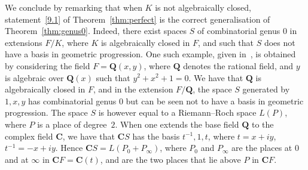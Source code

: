 \documentclass[10pt]{amsart}
\newcommand{\C}{\mathbf C}
\theoremstyle{definition}
\theoremstyle{remark}
\newcommand*\Q{{\mathbf Q}}
\renewcommand*\C{{\mathbf C}}
\begin{document}
We conclude by remarking that when $K$ is not algebraically closed, statement~\eqref{9.1} of Theorem~\ref{thm:perfect} is the correct generalisation of Theorem~\ref{thm:genus0}. Indeed, there exist spaces $S$ of combinatorial genus $0$ in extensions $F/K$, where $K$ is algebraically closed in $F$, and such that $S$ does not have a basis in geometric progression. One such example, given in~\cite{bszVosper}, is obtained by considering the field $F=\Q(x,y)$, where $\Q$ denotes the rational field, and $y$ is algebraic over $\Q(x)$ such that $y^2+x^2+1=0$. We have that $\Q$ is algebraically closed in $F$, and in the extension $F/\Q$, the space $S$ generated by $1,x,y$ has combinatorial genus $0$ but can be seen not to have a basis in geometric progression. The space $S$ is however equal to a Riemann--Roch space $L(P)$, where $P$ is a place of degree~$2$. When one extends the base field $\Q$ to the complex field $\C$, we have that $\C S$ has the basis $t^{-1},1,t$, where $t=x+iy$,$t^{-1}=-x+iy$. Hence $\C S= L(P_0+P_{\infty})$, where $P_0$ and $P_\infty$ are the places at $0$ and at $\infty$ in $\C F=\C(t)$, and are the two places that lie above $P$ in $\C F$.
\end{document}
